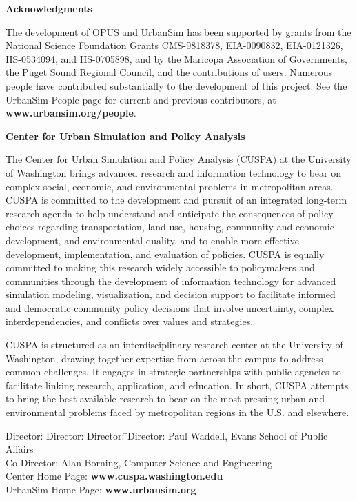 
{\bf \large Acknowledgments}

The development of OPUS and UrbanSim has been supported by
grants from the National Science Foundation Grants CMS-9818378,
EIA-0090832, EIA-0121326, IIS-0534094, and IIS-0705898,
and by the Maricopa Association
of Governments, the Puget Sound Regional Council, and
the contributions of users. Numerous people have contributed 
substantially to the development of this project. See the
UrbanSim People page for current and previous contributors,
at {\bf www.urbansim.org/people}.   

{\bf \large Center for Urban Simulation and Policy Analysis}

The Center for Urban Simulation and Policy Analysis (CUSPA) at the
University of Washington brings advanced research and information
technology to bear on complex social, economic, and environmental
problems in metropolitan areas.  CUSPA is committed to the
development and pursuit of an integrated long-term research agenda
to help understand and anticipate the consequences of policy
choices regarding transportation, land use, housing, community and
economic development, and environmental quality, and to enable
more effective development, implementation, and evaluation of
policies. CUSPA is equally committed to making this research
widely accessible to policymakers and communities through the
development of information technology for advanced simulation
modeling, visualization, and decision support to facilitate
informed and democratic community policy decisions that involve
uncertainty, complex interdependencies, and conflicts over values
and strategies.

CUSPA is structured as an interdisciplinary research center at the
University of Washington, drawing together expertise from across
the campus to address common challenges.  It engages in strategic
partnerships with public agencies to facilitate linking research,
application, and education.  In short, CUSPA attempts to bring the
best available research to bear on the most pressing urban and
environmental problems faced by metropolitan regions in the U.S.
and elsewhere.

\begin{tabbing}
Director: Director: Director: \= \kill Director:\> Paul Waddell,
Evans School of Public Affairs \\
Co-Director:\> Alan Borning, Computer Science and Engineering \\

Center Home Page: \> {\bf www.cuspa.washington.edu} \\
UrbanSim Home Page: \> {\bf www.urbansim.org}
\end{tabbing}

